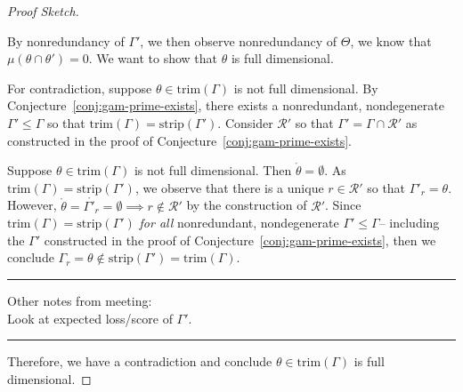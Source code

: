 \documentclass[12pt]{article}
\newcommand{\R}{\mathcal{R}}
\newcommand{\inter}[1]{\mathring{#1}}%
\newcommand{\trim}{\mathrm{trim}}
\newcommand{\strip}{\text{strip}}
\begin{document}
\begin{proof}[Proof Sketch]
\begin{enumerate}
		By nonredundancy of $\Gamma'$, we then observe nonredundancy of $\Theta$, we know that $\mu(\theta \cap \theta') = 0$.
		We want to show that $\theta$ is full dimensional.
		
		For contradiction, suppose $\theta \in \trim(\Gamma)$ is not full dimensional.
		By Conjecture~\ref{conj:gam-prime-exists}, there exists a nonredundant, nondegenerate $\Gamma' \leq \Gamma$ so that $\trim(\Gamma) = \strip(\Gamma')$.
		Consider $\R'$ so that $\Gamma' = \Gamma \cap \R'$ as constructed in the proof of Conjecture~\ref{conj:gam-prime-exists}.
		
		Suppose $\theta \in \trim(\Gamma)$ is not full dimensional.
		Then $\inter{\theta} = \emptyset$.
		As $\trim(\Gamma) = \strip(\Gamma')$, we observe that there is a unique $r \in \R'$ so that $\Gamma'_r = \theta$.
		However, $\inter{\theta} = \inter{\Gamma'_r} = \emptyset \implies r \not \in \R'$ by the construction of $\R'$.
		Since $\trim(\Gamma) = \strip(\Gamma')$ \emph{for all} nonredundant, nondegenerate $\Gamma' \leq \Gamma$-- including the $\Gamma'$ constructed in the proof of Conjecture~\ref{conj:gam-prime-exists}, then we conclude $\Gamma_r = \theta \not \in \strip(\Gamma') = \trim(\Gamma)$.
		
		
		\bigskip
		\hrule
		Other notes from meeting:\\
		Look at expected loss/score of $\Gamma'$.
		\hrule
	\end{enumerate}
	
	Therefore, we have a contradiction and conclude $\theta \in \trim(\Gamma)$ is full dimensional. 
\end{proof}
\end{document}
